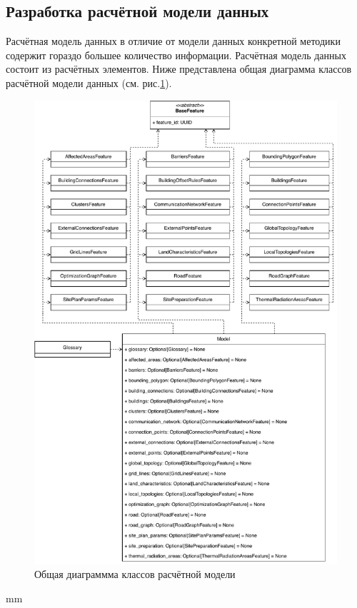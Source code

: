\subsection{\large{Разработка расчётной модели данных}}

Расчётная модель данных в отличие от модели данных конкретной методики содержит гораздо большее количество информации.
Расчётная модель данных состоит из расчётных элементов. Ниже представлена общая диаграмма классов расчётной модели данных
(см. рис.\ref{pic:implementation__model-classes}).

\begin{figure}[H]
	\includegraphics[width=\textwidth]{implementation/pictures/model/classes}
	\caption{Общая диаграммма классов расчётной модели}
	\label{pic:implementation__model-classes}
\end{figure}
 mm

